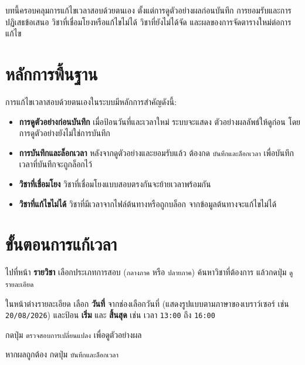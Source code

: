 
\noindent บทนี้ครอบคลุมการแก้ไขเวลาสอบด้วยตนเอง ตั้งแต่การดูตัวอย่างผลก่อนบันทึก
การยอมรับและการปฏิเสธข้อเสนอ วิชาที่เชื่อมโยงหรือแก้ไขไม่ได้
วิชาที่ยังไม่ได้จัด และผลของการจัดตารางใหม่ต่อการแก้ไข

\section{หลักการพื้นฐาน}

การแก้ไขเวลาสอบด้วยตนเองในระบบมีหลักการสำคัญดังนี้:

\begin{itemize}
  \item \textbf{การดูตัวอย่างก่อนบันทึก} เมื่อป้อนวันที่และเวลาใหม่ ระบบจะแสดง
        ตัวอย่างผลลัพธ์ให้ดูก่อน โดยการดูตัวอย่างยังไม่ใช่การบันทึก
  \item \textbf{การบันทึกและล็อกเวลา} หลังจากดูตัวอย่างและยอมรับแล้ว ต้องกด
        \texttt{บันทึกและล็อกเวลา} เพื่อบันทึก เวลาที่บันทึกจะถูกล็อกไว้
  \item \textbf{วิชาที่เชื่อมโยง} วิชาที่เชื่อมโยงแบบสอบตรงกันจะย้ายเวลาพร้อมกัน
  \item \textbf{วิชาที่แก้ไขไม่ได้} วิชาที่มีเวลาจากไฟล์ต้นทางหรือถูกบล็อก
        จากข้อมูลต้นทางจะแก้ไขไม่ได้
\end{itemize}

\section{ขั้นตอนการแก้เวลา}

\begin{steps}
  \item ไปที่หน้า \textbf{รายวิชา} เลือกประเภทการสอบ (\texttt{กลางภาค} หรือ
        \texttt{ปลายภาค}) ค้นหาวิชาที่ต้องการ แล้วกดปุ่ม \texttt{ดูรายละเอียด}
  \item ในหน้าต่างรายละเอียด เลือก \textbf{วันที่} จากช่องเลือกวันที่
        (แสดงรูปแบบตามภาษาของเบราว์เซอร์ เช่น \texttt{20/08/2026})
        และป้อน \textbf{เริ่ม} และ \textbf{สิ้นสุด}
        เช่น เวลา \texttt{13:00} ถึง \texttt{16:00}
  \item กดปุ่ม \texttt{ตรวจสอบการเปลี่ยนแปลง} เพื่อดูตัวอย่างผล
  \item หากผลถูกต้อง กดปุ่ม \texttt{บันทึกและล็อกเวลา}
\end{steps}

